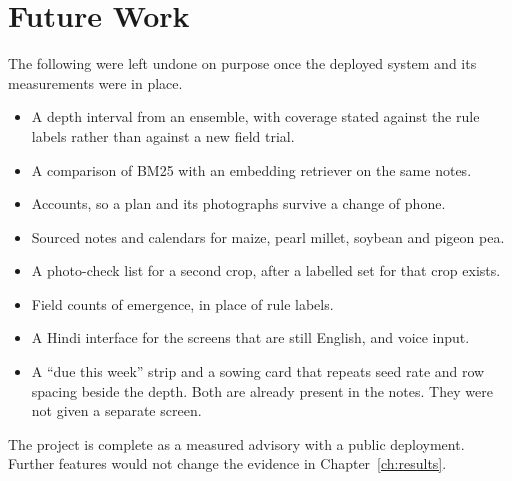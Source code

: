 \section{Future Work}
The following were left undone on purpose once the deployed system and its measurements were in place.

\begin{itemize}[leftmargin=1.4em]
    \item A depth interval from an ensemble, with coverage stated against the rule labels rather than against a new field trial.
    \item A comparison of BM25 with an embedding retriever on the same notes.
    \item Accounts, so a plan and its photographs survive a change of phone.
    \item Sourced notes and calendars for maize, pearl millet, soybean and pigeon pea.
    \item A photo-check list for a second crop, after a labelled set for that crop exists.
    \item Field counts of emergence, in place of rule labels.
    \item A Hindi interface for the screens that are still English, and voice input.
    \item A ``due this week'' strip and a sowing card that repeats seed rate and row spacing beside the depth. Both are already present in the notes. They were not given a separate screen.
\end{itemize}

The project is complete as a measured advisory with a public deployment. Further features would not change the evidence in Chapter~\ref{ch:results}.
